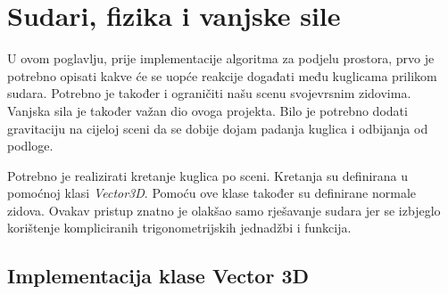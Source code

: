\chapter{Sudari, fizika i vanjske sile}
U ovom poglavlju, prije implementacije algoritma za podjelu prostora, prvo je potrebno opisati kakve će se uopće reakcije događati među kuglicama prilikom sudara. Potrebno je također i ograničiti našu scenu svojevrsnim zidovima. Vanjska sila je također važan dio ovoga projekta. Bilo je potrebno dodati gravitaciju na cijeloj sceni da se dobije dojam padanja kuglica i odbijanja od podloge. 

Potrebno je realizirati kretanje kuglica po sceni. Kretanja su definirana u pomoćnoj klasi \emph{Vector3D}. Pomoću ove klase također su definirane normale zidova. Ovakav pristup znatno je olakšao samo rješavanje sudara jer se izbjeglo korištenje kompliciranih trigonometrijskih jednadžbi i funkcija.\newpage

\section{Implementacija klase Vector 3D}\label{sec:vec3}

